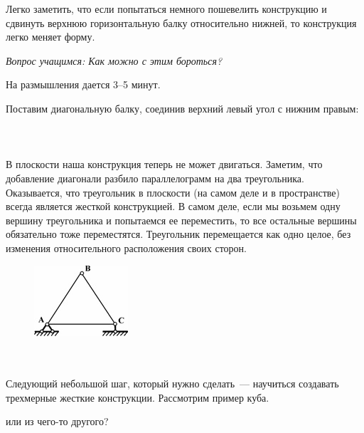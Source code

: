 Легко заметить, что если попытаться немного пошевелить конструкцию и сдвинуть верхнюю горизонтальную балку относительно нижней, то конструкция легко меняет форму. 

{\slshape Вопрос учащимся: Как можно с этим бороться?
	
	На размышления дается 3--5 минут.}	

Поставим диагональную балку, соединив верхний левый угол с нижним правым:\\\\

\\\\

В плоскости наша конструкция теперь не может двигаться. Заметим, что добавление диагонали разбило параллелограмм на два треугольника. Оказывается, что треугольник в плоскости (на самом деле и в пространстве) всегда является жесткой конструкцией. В самом деле, если мы возьмем одну вершину треугольника и попытаемся ее переместить, то все остальные вершины обязательно тоже переместятся. Треугольник перемещается как одно целое, без изменения относительного расположения своих сторон.

\begin{figure}[h!]
	\begin{center}
		\includegraphics[width=0.3\linewidth]{chapters/chapter19/images/1}
		\caption{}
		\label{ris:image19x1}
	\end{center}
\end{figure}

{\hypertarget{lesson19x3}{}}\\\\

Следующий небольшой шаг, который нужно сделать~--- научиться создавать трехмерные жесткие конструкции. Рассмотрим пример куба.

 или из чего-то другого?

